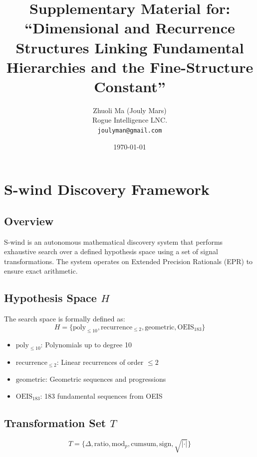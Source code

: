 \documentclass[12pt,a4paper]{article}
\title{Supplementary Material for:\\
``Dimensional and Recurrence Structures Linking Fundamental Hierarchies 
and the Fine-Structure Constant''}
\author{Zhuoli Ma (Jouly Mars)\\
\small Rogue Intelligence LNC.\\
\small \texttt{joulyman@gmail.com}}
\date{\today}
\begin{document}
\maketitle

\tableofcontents

\section{S-wind Discovery Framework}

\subsection{Overview}

S-wind is an autonomous mathematical discovery system that performs exhaustive 
search over a defined hypothesis space using a set of signal transformations. 
The system operates on Extended Precision Rationals (EPR) to ensure exact arithmetic.

\subsection{Hypothesis Space $H$}

The search space is formally defined as:
\begin{equation}
H = \{\text{poly}_{\leq 10}, \text{recurrence}_{\leq 2}, \text{geometric}, 
\text{OEIS}_{183}\}
\end{equation}

\begin{itemize}
\item $\text{poly}_{\leq 10}$: Polynomials up to degree 10
\item $\text{recurrence}_{\leq 2}$: Linear recurrences of order $\leq 2$
\item $\text{geometric}$: Geometric sequences and progressions
\item $\text{OEIS}_{183}$: 183 fundamental sequences from OEIS
\end{itemize}

\subsection{Transformation Set $T$}

\begin{equation}
T = \{\Delta, \text{ratio}, \text{mod}_p, \text{cumsum}, \text{sign}, \sqrt{|\cdot|}\}
\end{equation}
\end{document}
